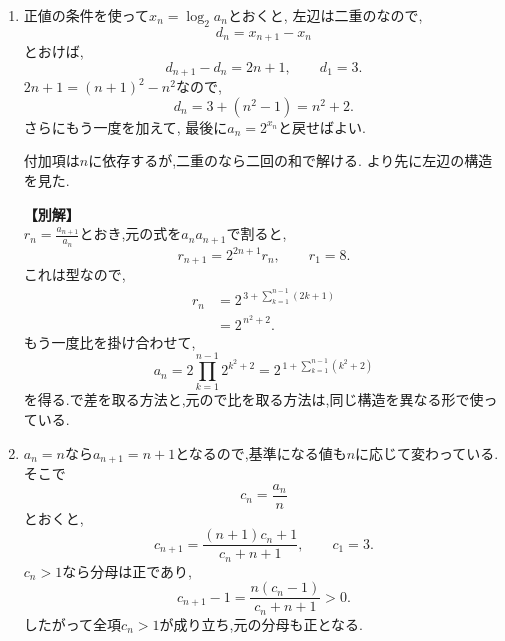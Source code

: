 \begin{enumerate}[label=\textbf{問\arabic*.},leftmargin=3.8em,format=\bookitemlink{practice-advanced}{solution}{problem}]
    和と差にはそれぞれに適した解法を使える.
  \item 正値の条件を使って$x_n=\log_2a_n$とおくと,
    \BookMathLayout{\[
        x_{n+2}-2x_{n+1}+x_n=2n+1,
        \qquad x_1=1,\quad x_2=4.
      \]}{
      \[
        \begin{aligned}
          x_{n+2}-2x_{n+1}+x_n&=2n+1,\\
          x_1&=1,\quad x_2=4.
        \end{aligned}
      \]
    }
    左辺は二重のなので,
    \[
      d_n=x_{n+1}-x_n
    \]
    とおけば,
    \[
      d_{n+1}-d_n=2n+1,\qquad d_1=3.
    \]
    $2n+1=(n+1)^2-n^2$なので,
    \[
      d_n=3+(n^2-1)=n^2+2.
    \]
    さらにもう一度を加えて,
    最後に$a_n=2^{x_n}$と戻せばよい.

    付加項は$n$に依存するが,二重のなら二回の和で解ける.
    より先に左辺の構造を見た.

    \noindent \textbf{【別解】}\\
    $r_n=\frac{a_{n+1}}{a_n}$とおき,元の式を$a_na_{n+1}$で割ると,
    \[
      r_{n+1}=2^{2n+1}r_n,\qquad r_1=8.
    \]
    これは型なので,
    \begin{align*}
      r_n
      &=2^{\,3+\sum_{k=1}^{n-1}(2k+1)}\\
      &=2^{\,n^2+2}.
    \end{align*}
    もう一度比を掛け合わせて,
    \[
      a_n
      =2\prod_{k=1}^{n-1}2^{k^2+2}
      =2^{\,1+\sum_{k=1}^{n-1}(k^2+2)}
    \]
    を得る.で差を取る方法と,元ので比を取る方法は,同じ構造を異なる形で使っている.
  \item $a_n=n$なら$a_{n+1}=n+1$となるので,基準になる値も$n$に応じて変わっている.そこで
    \[
      c_n=\frac{a_n}{n}
    \]
    とおくと,
    \[
      c_{n+1}
      =\frac{(n+1)c_n+1}{c_n+n+1},
      \qquad c_1=3.
    \]
    $c_n>1$なら分母は正であり,
    \[
      c_{n+1}-1=\frac{n(c_n-1)}{c_n+n+1}>0.
    \]
    したがって全項$c_n>1$が成り立ち,元の分母も正となる.


\end{enumerate}
